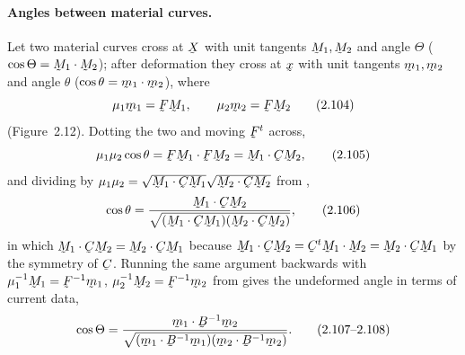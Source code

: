 \paragraph*{Angles between material curves.}
Let two material curves cross at $\bX$ with unit tangents $\bM_1,\bM_2$ and
angle $\Theta$ ($\cos\Theta=\ip{\bM_1}{\bM_2}$); after deformation they cross
at $\bx$ with unit tangents $\bmm_1,\bmm_2$ and angle $\theta$
($\cos\theta=\ip{\bmm_1}{\bmm_2}$), where
\begin{equation}
   \mu_1\bmm_1=\bF\bM_1,\qquad \mu_2\bmm_2=\bF\bM_2 \tag{2.104}\label{eq:2.104}
\end{equation}
(Figure~2.12). Dotting the two and moving $\bF^{t}$ across,
\begin{equation}
   \mu_1\mu_2\cos\theta=\ip{\bF\bM_1}{\bF\bM_2}=\ip{\bM_1}{\bC\bM_2}, \tag{2.105}\label{eq:2.105}
\end{equation}
and dividing by $\mu_1\mu_2=\sqrt{\ip{\bM_1}{\bC\bM_1}}\sqrt{\ip{\bM_2}{\bC\bM_2}}$
from ,
\begin{equation}
   \cos\theta=\frac{\ip{\bM_1}{\bC\bM_2}}
   {\sqrt{(\ip{\bM_1}{\bC\bM_1})(\ip{\bM_2}{\bC\bM_2})}} , \tag{2.106}\label{eq:2.106}
\end{equation}
in which $\ip{\bM_1}{\bC\bM_2}=\ip{\bM_2}{\bC\bM_1}$ because
$\ip{\bM_1}{\bC\bM_2}=\ip{\bC^{t}\bM_1}{\bM_2}=\ip{\bM_2}{\bC\bM_1}$ by the
symmetry of $\bC$. Running the same argument backwards with
$\mu_1^{-1}\bM_1=\bF^{-1}\bmm_1$, $\mu_2^{-1}\bM_2=\bF^{-1}\bmm_2$ from
 gives the undeformed angle in terms of current data,
\begin{equation}
   \cos\Theta=\frac{\ip{\bmm_1}{\bB^{-1}\bmm_2}}
   {\sqrt{(\ip{\bmm_1}{\bB^{-1}\bmm_1})(\ip{\bmm_2}{\bB^{-1}\bmm_2})}} . \tag{2.107--2.108}\label{eq:2.107}
\end{equation}

